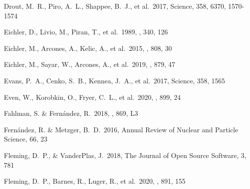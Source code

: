 \documentclass[twocolumn, twocolappendix]{aastex63}
\begin{document}
\begin{thebibliography}{}
 Drout, M.~R., Piro, A.~L., Shappee, B.~J., et al.\ 2017, Science, 358, 6370, 1570-1574




 Eichler, D., Livio, M., Piran, T., et al.\ 1989, \nat, 340, 126


 Eichler, M., Arcones, A., Kelic, A., et al.\ 2015, \apj, 808, 30


 Eichler, M., Sayar, W., Arcones, A., et al.\ 2019, \apj, 879, 47




 Evans, P.~A., Cenko, S.~B., Kennea, J.~A., et al.\ 2017, Science, 358, 1565


 Even, W., Korobkin, O., Fryer, C.~L., et al.\ 2020, \apj, 899, 24


 Fahlman, S. \& Fern{\'a}ndez, R.\ 2018, \apjl, 869, L3




 Fern{\'a}ndez, R. \& Metzger, B.~D.\ 2016, Annual Review of Nuclear and Particle Science, 66, 23






 Fleming, D.~P., \& VanderPlas, J.\ 2018, The Journal of Open Source Software, 3, 781


 Fleming, D.~P., Barnes, R., Luger, R., et al.\ 2020, \apj, 891, 155



\end{thebibliography}
\end{document}
